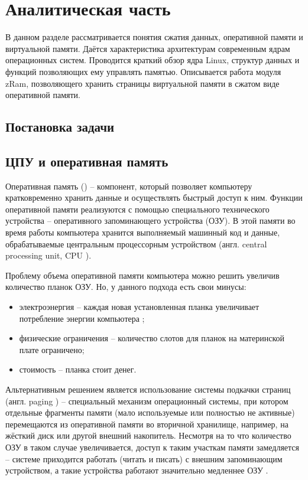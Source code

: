 \section{Аналитическая часть}

В данном разделе рассматривается понятия сжатия данных, оперативной памяти и виртуальной памяти. Даётся характеристика архитектурам современным ядрам операционных систем. Проводится краткий обзор ядра Linux, структур данных и функций позволяющих ему управлять памятью. Описывается работа модуля zRam, позволяющего хранить страницы виртуальной памяти в сжатом виде оперативной памяти.

\subsection{Постановка задачи}

\subsection{ЦПУ и оперативная память} 

Оперативная память (\cite{ram}) -- компонент, который позволяет компьютеру кратковременно хранить данные и осуществлять быстрый доступ к ним. Функции оперативной памяти реализуются с помощью специального технического устройства -- оперативного запоминающего устройства (ОЗУ). В этой памяти во время работы компьютера хранится выполняемый машинный код и данные, обрабатываемые центральным процессорным устройством (англ. central processing unit, CPU \cite{cpu}).

Проблему объема оперативной памяти компьютера можно решить увеличив количество планок ОЗУ. Но, у данного подхода есть свои минусы:

\begin{itemize}
	\item электроэнергия -- каждая новая установленная планка увеличивает потребление энергии компьютера \cite{increasing-ram-bad};
	\item физические ограничения -- количество слотов для планок на материнской плате ограничено;
	\item стоимость -- планка стоит денег.
\end{itemize}

Альтернативным решением является использование системы подкачки страниц (англ. paging \cite{paging}) -- специальный механизм операционный системы, при котором отдельные фрагменты памяти (мало используемые или полностью не активные) перемещаются из оперативной памяти во вторичной хранилище, например, на жёсткий диск или другой внешний накопитель. Несмотря на то что количество ОЗУ в таком случае увеличивается, доступ к таким участкам памяти замедляется -- системе приходится работать (читать и писать) с внешним запоминающим устройством, а такие устройства работают значительно медленнее ОЗУ \cite{ssd-hdd-speed}.

